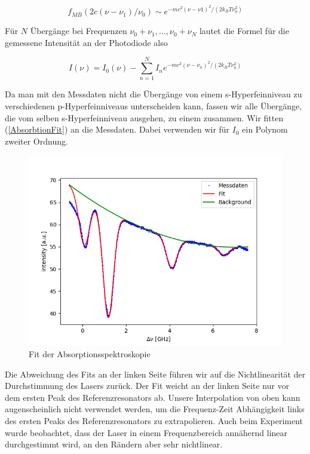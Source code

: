 \documentclass[a4paper,parskip]{scrartcl}
\begin{document}
$$f_{MB}(2c(\nu-\nu_1)/\nu_0) \sim e^{-mc^2(\nu-\nu1)^2/(2k_BT\nu_0^2)}$$

Für $N$ Übergänge bei Frequenzen $\nu_0+\nu_1,...,\nu_0+\nu_N$ lautet die Formel für die gemessene Intensität an der Photodiode also

\begin{equation}
I(\nu) = I_0(\nu) - \sum_{n=1}^N I_n e^{-mc^2(\nu-\nu_n)^2/(2k_BT\nu_0^2)}
\label{AbsorbtionFit}
\end{equation}

Da man mit den Messdaten nicht die Übergänge von einem s-Hyperfeinniveau zu verschiedenen p-Hyperfeinniveaus unterscheiden kann, fassen wir alle Übergänge, die vom selben s-Hyperfeinniveau ausgehen, zu einem zusammen. Wir fitten (\ref{AbsorbtionFit}) an die Messdaten. Dabei verwenden wir für $I_0$ ein Polynom zweiter Ordnung.

\begin{figure}[h]
\centering
\includegraphics[scale = 0.5]{./absorbtion/fit.png}
\caption{Fit der Absorptionsspektroskopie}
\end{figure}

Die Abweichung des Fits an der linken Seite führen wir auf die Nichtlinearität der Durchstimmung des Lasers zurück. Der Fit weicht an der linken Seite nur vor dem ersten Peak des Referenzresonators ab. Unsere Interpolation von oben kann augenscheinlich nicht verwendet werden, um die Frequenz-Zeit Abhängigkeit links des ersten Peaks des Referenzresonators zu extrapolieren. Auch beim Experiment wurde beobachtet, dass der Laser in einem Frequenzbereich annähernd linear durchgestimmt wird, an den Rändern aber sehr nichtlinear.
\end{document}
